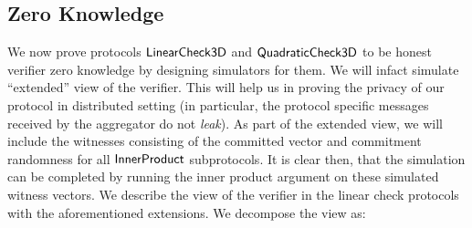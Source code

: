 \subsection{Zero Knowledge}
We now prove protocols $\mathsf{LinearCheck3D}$ and $\mathsf{QuadraticCheck3D}$ to be honest verifier zero knowledge by
designing simulators for them. We will infact simulate ``extended'' view of the
verifier. This will help us in proving the privacy of our protocol in
distributed setting (in particular, the protocol specific messages received by
the aggregator do not {\em leak}). As part of the extended view, we will include
the witnesses consisting of the committed vector and commitment randomness for
all $\mathsf{InnerProduct}$ subprotocols. It is clear then, that the simulation can be
completed by running the inner product argument on these simulated witness
vectors. We describe the view of the verifier in the linear check protocols with
the aforementioned extensions. We decompose the view as:
